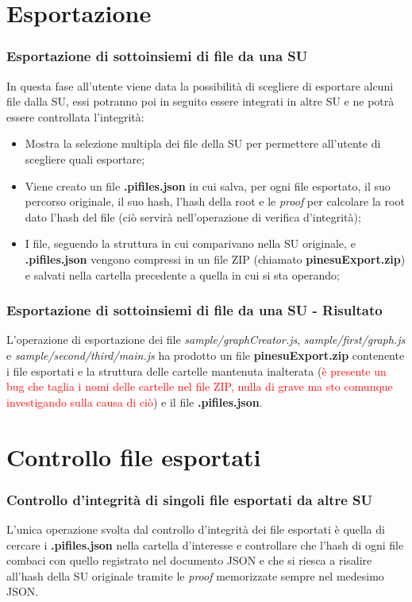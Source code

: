 \documentclass{beamer}
\begin{document}
\section{Esportazione}
\begin{frame}
	\frametitle{Esportazione di sottoinsiemi di file da una SU}
	In questa fase all'utente viene data la possibilità di scegliere di esportare alcuni file dalla SU, essi potranno poi in seguito essere integrati in altre SU e ne potrà essere controllata l'integrità:
	\begin{itemize}
		\item Mostra la selezione multipla dei file della SU per permettere all'utente di scegliere quali esportare;
		\item Viene creato un file \textbf{.pifiles.json} in cui salva, per ogni file esportato, il suo percorso originale, il suo hash, l'hash della root e le \emph{proof} per calcolare la root dato l'hash del file (ciò servirà nell'operazione di verifica d'integrità);
		\item I file, seguendo la struttura in cui comparivano nella SU originale, e \textbf{.pifiles.json} vengono compressi in un file ZIP (chiamato \textbf{pinesuExport.zip}) e salvati nella cartella precedente a quella in cui si sta operando;
	\end{itemize}
\end{frame}
\begin{frame}
	\frametitle{Esportazione di sottoinsiemi di file da una SU - Risultato}
	L'operazione di esportazione dei file \emph{sample/graphCreator.js}, \emph{sample/first/graph.js} e \emph{sample/second/third/main.js} ha prodotto un file \textbf{pinesuExport.zip} contenente i file esportati e la struttura delle cartelle mantenuta inalterata (\textcolor{red}{è presente un bug che taglia i nomi delle cartelle nel file ZIP, nulla di grave ma sto comunque investigando sulla causa di ciò}) e il file \textbf{.pifiles.json}.
\end{frame}
\section{Controllo file esportati}
\begin{frame}
	\frametitle{Controllo d'integrità di singoli file esportati da altre SU}
	L'unica operazione svolta dal controllo d'integrità dei file esportati è quella di cercare i \textbf{.pifiles.json} nella cartella d'interesse e controllare che l'hash di ogni file combaci con quello registrato nel documento JSON e che si riesca a risalire all'hash della SU originale tramite le \emph{proof} memorizzate sempre nel medesimo JSON. 
\end{frame}
\end{document}
